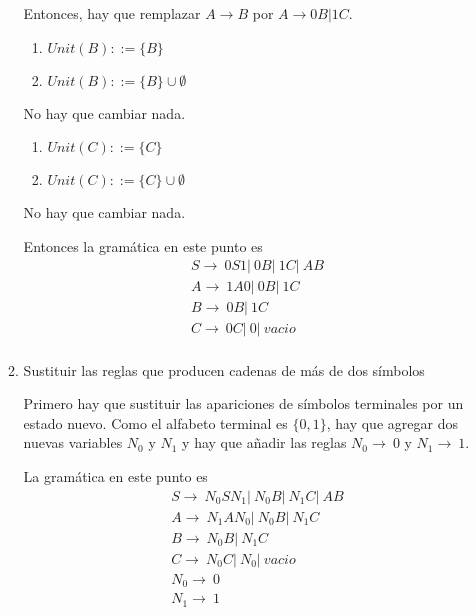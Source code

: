 \documentclass{article}
\begin{document}
\begin{enumerate}
\begin{enumerate}
        Entonces, hay que remplazar $A \rightarrow B$ por $A \rightarrow 0B| 1C$.

        \begin{enumerate}
            \item $Unit(B) ::= \{B\}$
            \item $Unit(B) ::= \{B\} \cup \emptyset$
        \end{enumerate}
        No hay que cambiar nada.

        \begin{enumerate}
            \item $Unit(C) ::= \{C\}$
            \item $Unit(C) ::= \{C\} \cup \emptyset$
        \end{enumerate}
        No hay que cambiar nada.

        Entonces la gramática en este punto es 
        \begin{align*}
            &S \rightarrow \ 0S1 |\ 0B |\ 1C |\ AB \\
            &A \rightarrow \ 1A0 | \ 0B | \ 1C\\
            &B \rightarrow \ 0B |\ 1C \\
            &C \rightarrow \ 0C |\ 0 |\ vacio \\
        \end{align*}

        \item Sustituir las reglas que producen cadenas de más de dos símbolos
        
        Primero hay que sustituir las apariciones de símbolos terminales por un
        estado nuevo. Como el alfabeto terminal es $\{0, 1\}$, hay que agregar 
        dos nuevas variables $N_0$ y $N_1$ y hay que añadir las reglas $N_0 \rightarrow \ 0 $ y $N_1 \rightarrow \ 1$.

        La gramática en este punto es
        \begin{align*}
            &S \rightarrow \ N_0SN_1 |\ N_0B |\ N_1C |\ AB \\
            &A \rightarrow \ N_1AN_0 |\ N_0B |\ N_1C \\
            &B \rightarrow \ N_0B |\ N_1C \\
            &C \rightarrow \ N_0C |\ N_0 |\ vacio \\
            &N_0 \rightarrow \ 0 \\
            &N_1 \rightarrow \ 1
        \end{align*}


\end{enumerate}
\end{enumerate}
\end{document}
